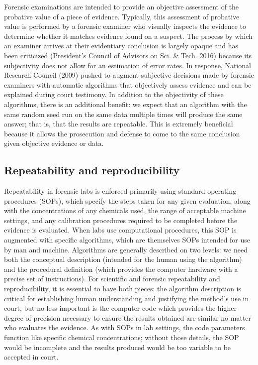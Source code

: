 Forensic examinations are intended to provide an objective assessment of the probative value of a piece of evidence.
Typically, this assessment of probative value is performed by a forensic examiner who visually inspects the evidence to determine whether it matches evidence found on a suspect.
The process by which an examiner arrives at their evidentiary conclusion is largely opaque and has been criticized (President's Council of Advisors on Sci. \& Tech. 2016) because its subjectivity does not allow for an estimation of error rates.
In response, National Research Council (2009) pushed to augment subjective decisions made by forensic examiners with automatic algorithms that objectively assess evidence and can be explained during court testimony.
In addition to the objectivity of these algorithms, there is an additional benefit: we expect that an algorithm with the same random seed run on the same data multiple times will produce the same answer; that is, that the results are repeatable.
This is extremely beneficial because it allows the prosecution and defense to come to the same conclusion given objective evidence or data.

\hypertarget{repeatability-and-reproducibility}{%
\subsection{Repeatability and reproducibility}\label{repeatability-and-reproducibility}}

Repeatability in forensic labs is enforced primarily using standard operating procedures (SOPs), which specify the steps taken for any given evaluation, along with the concentrations of any chemicals used, the range of acceptable machine settings, and any calibration procedures required to be completed before the evidence is evaluated.
When labs use computational procedures, this SOP is augmented with specific algorithms, which are themselves SOPs intended for use by man and machine.
Algorithms are generally described on two levels: we need both the conceptual description (intended for the human using the algorithm) and the procedural definition (which provides the computer hardware with a precise set of instructions).
For scientific and forensic repeatability and reproducibility, it is essential to have both pieces: the algorithm description is critical for establishing human understanding and justifying the method's use in court, but no less important is the computer code which provides the higher degree of precision necessary to ensure the results obtained are similar no matter who evaluates the evidence.
As with SOPs in lab settings, the code parameters function like specific chemical concentrations; without those details, the SOP would be incomplete and the results produced would be too variable to be accepted in court.

